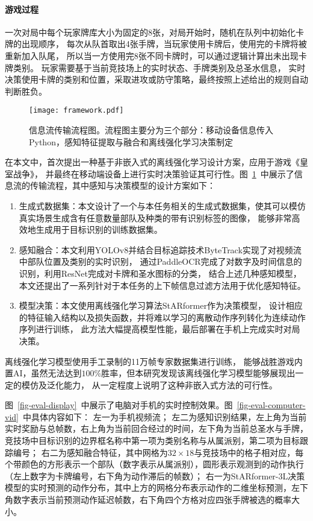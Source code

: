 \paragraph*{游戏过程}一次对局中每个玩家牌库大小为固定的8张，对局开始时，随机在队列中初始化卡牌的出现顺序，
每次从队首取出4张手牌，当玩家使用卡牌后，使用完的卡牌将被重新加入队尾，
所以当一方使用完8张不同卡牌时，可以通过逻辑计算出未出现卡牌类别。
玩家需要基于当前竞技场上的实时状态、手牌类别及总圣水信息，
实时决策使用卡牌的类别和位置，采取进攻或防守策略，最终按照上述给出的规则自动判断胜负。

\begin{figure}[htbp]
  \centering\vspace{-3ex}
  \texttt{[image: framework.pdf]}
  \caption{信息流传输流程图。流程图主要分为三个部分：移动设备信息传入Python，感知特征提取与融合和离线强化学习决策制定}\label{fig-framework}
\end{figure}
在本文中，首次提出一种基于非嵌入式的离线强化学习设计方案，应用于游戏《皇室战争》，
并最终在移动端设备上进行实时决策验证其可行性。图~\ref{fig-framework}~中展示了信息流的传输流程，其中感知与决策模型的设计方案如下：
\begin{enumerate}
  \item 生成式数据集：本文设计了一个与本任务相关的生成式数据集，使其可以模仿真实场景生成含有任意数量部队及种类的带有识别标签的图像，
  能够非常高效地生成用于目标识别的训练数据集。
  \item 感知融合：本文利用YOLOv8并结合目标追踪技术ByteTrack实现了对视频流中部队位置及类别的实时识别，
  通过PaddleOCR完成了对数字及时间信息的识别，利用ResNet完成对卡牌和圣水图标的分类，
  结合上述几种感知模型，本文还提出了一系列针对于本任务的上下帧信息过滤方法用于优化感知特征。
  \item 模型决策：本文使用离线强化学习算法StARformer作为决策模型，
  设计相应的特征输入结构以及损失函数，并将难以学习的离散动作序列转化为连续动作序列进行训练，
  此方法大幅提高模型性能，最后部署在手机上完成实时对局决策。
\end{enumerate}

离线强化学习模型使用手工录制的11万帧专家数据集进行训练，
能够战胜游戏内置AI，虽然无法达到$100\%$胜率，但本研究发现该离线强化学习模型能够展现出一定的模仿及泛化能力，
从一定程度上说明了这种非嵌入式方法的可行性。

图~\ref{fig-eval-display}~中展示了电脑对手机的实时控制效果。图~\ref{fig-eval-computer-vid}~中具体内容如下：
左一为手机视频流；
左二为感知识别结果，左上角为当前实时奖励与总帧数，右上角为当前回合经过的时间，左下角为当前总圣水与手牌，竞技场中目标识别的边界框名称中第一项为类别名称与从属派别，第二项为目标跟踪编号；
右二为感知融合特征，其中网格为$32\times 18$与竞技场中的格子相对应，每个带颜色的方形表示一个部队（数字表示从属派别），圆形表示观测到的动作执行（左上数字为卡牌编号，右下角为动作滞后的帧数）；
右一为StARformer-3L决策模型的实时预测的动作分布，其中上方的网格分布表示动作的二维坐标预测，左下角数字表示当前预测动作延迟帧数，右下角四个方格对应四张手牌被选的概率大小。

